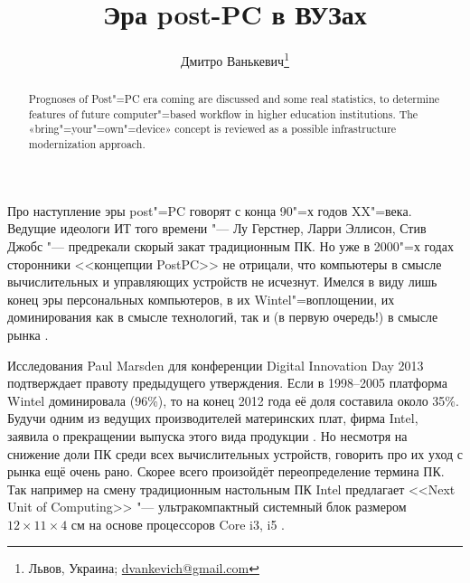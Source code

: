 \documentclass[10pt, a5paper]{article}
\begin{document}
\title{Эра post-PC в ВУЗах}%

\author{Дмитро Ванькевич\footnote{Львов, Украина; \url{dvankevich@gmail.com}}}
\maketitle

\begin{abstract}
Prognoses of Post"=PC era coming are discussed and some real statistics, to determine features of future computer"=based \linebreak workflow in higher education institutions. The «bring"=your"=own"=device» concept is reviewed as a possible infrastructure \linebreak modernization approach.
\end{abstract}

Про наступление эры post"=PC говорят с конца 90"=х годов XX"=века. Ведущие идеологи ИТ того времени "--- Лу Герстнер, Ларри Эллисон, Стив Джобс "--- предрекали скорый закат традиционным ПК. Но уже в 2000"=х годах сторонники <<концепции PostPC>> не отрицали, что компьютеры в смысле вычислительных и управляющих устройств не исчезнут. Имелся в виду лишь конец эры персональных компьютеров, в их Wintel"=воплощении\cite{Vank1}, их доминирования как в смысле технологий, так и (в первую очередь!) в смысле рынка \cite{Vank2}.

Исследования Paul Marsden для конференции Digital Innovation Day 2013 подтверждает правоту предыдущего утверждения\cite{Vank3}. Если в 1998--2005 платформа Wintel доминировала (96\%), то на конец 2012 года её доля составила около 35\%. Будучи одним из ведущих производителей материнских плат, фирма Intel, заявила о прекращении выпуска этого вида продукции \cite{Vank4}. Но несмотря на снижение доли ПК среди всех вычислительных устройств, говорить про их уход с рынка ещё очень рано. Скорее всего произойдёт переопределение термина ПК. Так например на смену традиционным настольным ПК Intel предлагает <<Next Unit of Computing>> "--- ультракомпактный системный блок размером $12\times11\times4$ см на основе процессоров Core i3, i5 \cite{Vank5}.
\end{document}
